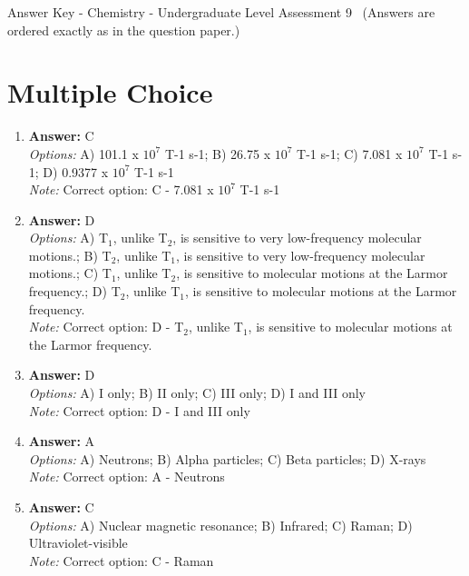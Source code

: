 \documentclass[12pt]{article}
\begin{document}
\begin{center}
Answer Key - Chemistry - Undergraduate Level Assessment 9 \
\small (Answers are ordered exactly as in the question paper.)
\end{center}

\section*{Multiple Choice}
\begin{enumerate}[label=\arabic*.]
\item \textbf{Answer:} C
\\ \textit{Options:} A) 101.1 x $10^7$ T-1 s-1; B) 26.75 x $10^7$ T-1 s-1; C) 7.081 x $10^7$ T-1 s-1; D) 0.9377 x $10^7$ T-1 s-1
\\ \textit{Note:} Correct option: C - 7.081 x $10^7$ T-1 s-1
\item \textbf{Answer:} D
\\ \textit{Options:} A) T$_{1}$, unlike T$_{2}$, is sensitive to very low-frequency molecular motions.; B) T$_{2}$, unlike T$_{1}$, is sensitive to very low-frequency molecular motions.; C) T$_{1}$, unlike T$_{2}$, is sensitive to molecular motions at the Larmor frequency.; D) T$_{2}$, unlike T$_{1}$, is sensitive to molecular motions at the Larmor frequency.
\\ \textit{Note:} Correct option: D - T$_{2}$, unlike T$_{1}$, is sensitive to molecular motions at the Larmor frequency.
\item \textbf{Answer:} D
\\ \textit{Options:} A) I only; B) II only; C) III only; D) I and III only
\\ \textit{Note:} Correct option: D - I and III only
\item \textbf{Answer:} A
\\ \textit{Options:} A) Neutrons; B) Alpha particles; C) Beta particles; D) X-rays
\\ \textit{Note:} Correct option: A - Neutrons
\item \textbf{Answer:} C
\\ \textit{Options:} A) Nuclear magnetic resonance; B) Infrared; C) Raman; D) Ultraviolet-visible
\\ \textit{Note:} Correct option: C - Raman
\end{enumerate}
\end{document}

